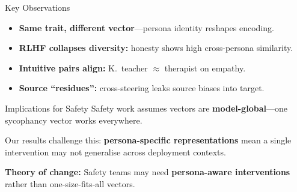 \documentclass[a1paper]{article}
\newcommand{\smallbody}{\fontsize{18}{23}\selectfont\color{eracharcoal}}
\begin{document}

\newlength{\remainingheight}
\setlength{\remainingheight}{\dimexpr\textheight-\pagetotal-22mm\relax}

\noindent
\begin{minipage}[t][\remainingheight]{0.32\textwidth}
\begin{posterblock}[equal height group=row4]{Key Observations}
\smallbody
\begin{itemize}[leftmargin=4mm, itemsep=3pt, labelsep=2mm, topsep=0pt]
    \item[\color{eracrimson}\textbullet] \textbf{Same trait, different vector}---persona identity reshapes encoding.
    \item[\color{eracrimson}\textbullet] \textbf{RLHF collapses diversity:} honesty shows high cross-persona similarity.
    \item[\color{eracrimson}\textbullet] \textbf{Intuitive pairs align:} K.\ teacher $\approx$ therapist on empathy.
    \item[\color{eracrimson}\textbullet] \textbf{Source ``residues'':} cross-steering leaks source biases into target.
\end{itemize}
\vfill
\end{posterblock}
\end{minipage}\hfill
\begin{minipage}[t][\remainingheight]{0.34\textwidth}
\begin{posterblock}[equal height group=row4]{Implications for Safety}
\smallbody
Safety work assumes vectors are \textbf{model-global}---one sycophancy vector works everywhere.

\smallskip
Our results challenge this: \textbf{persona-specific representations} mean a single intervention may not generalise across deployment contexts.

\smallskip
{\color{eracrimson}\textbf{Theory of change:}} Safety teams may need \textbf{persona-aware interventions} rather than one-size-fits-all vectors.
\vfill
\end{posterblock}
\end{minipage}\hfill
\end{document}
